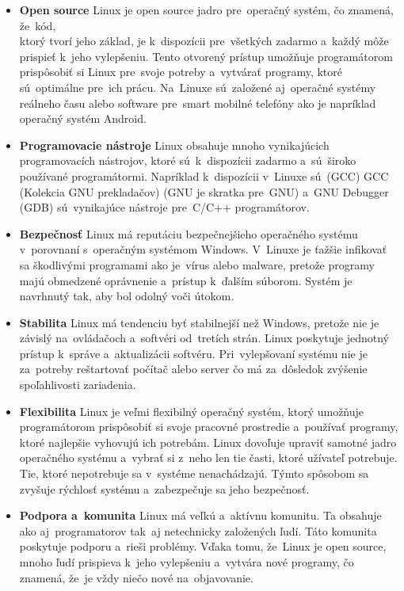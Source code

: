 \begin{itemize}
	\item \textbf{Open source} Linux je open source jadro pre~operačný systém, čo znamená, že~kód,\\
		ktorý tvorí jeho základ, je k~dispozícii pre~všetkých zadarmo a~každý môže prispieť
		k~jeho vylepšeniu. Tento otvorený prístup umožňuje programátorom prispôsobiť si Linux
		pre~svoje potreby a~vytvárať programy, ktoré sú~optimálne pre~ich prácu. Na~Linuxe
		sú~založené aj~operačné systémy reálneho času alebo software pre~smart mobilné telefóny
		ako je napríklad operačný systém Android.

	\item \textbf{Programovacie nástroje} Linux obsahuje mnoho vynikajúcich programovacích nástrojov, ktoré sú~k~dispozícii
		zadarmo a~sú~široko používané programátormi. Napríklad k~dispozícii v~Linuxe sú~(GCC) \acrlong{GCC} (Kolekcia GNU prekladačov)
		(GNU je skratka pre~\acrlong{GNU}) a~GNU Debugger (GDB) sú~vynikajúce nástroje pre~C/C++ programátorov.

	\item \textbf{Bezpečnosť} Linux má reputáciu bezpečnejšieho operačného systému v~porovnaní s~operačným systémom Windows.
		V~Linuxe je ťažšie infikovať sa škodlivými programami ako je~vírus alebo malware, pretože programy majú obmedzené
		oprávnenie a~prístup k~ďalším súborom. Systém je navrhnutý tak, aby bol odolný voči útokom.

	\item \textbf{Stabilita} Linux má tendenciu byť stabilnejší než Windows, pretože nie je závislý na~ovládačoch a~softvéri
		od~tretích strán. Linux poskytuje jednotný prístup k~správe a~aktualizácii softvéru. Pri~vylepšovaní systému nie je
		za~potreby reštartovať počítač alebo server čo má za~dôsledok zvýšenie spoľahlivosti zariadenia.

	\item \textbf{Flexibilita} Linux je veľmi flexibilný operačný systém, ktorý umožňuje programátorom prispôsobiť si svoje pracovné
		prostredie a~používať programy, ktoré najlepšie vyhovujú ich potrebám. Linux dovoľuje upraviť samotné jadro
		operačného systému a~vybrať si z~neho len tie časti, ktoré užívateľ potrebuje. Tie, ktoré nepotrebuje sa
		v~systéme nenachádzajú. Týmto spôsobom sa zvyšuje rýchlosť systému a~zabezpečuje sa jeho bezpečnosť.

	\item \textbf{Podpora a~komunita} Linux má veľkú a~aktívnu komunitu. Ta obsahuje ako aj~programatorov tak~aj
		netechnicky založených ľudí. Táto komunita poskytuje podporu a~rieši problémy. Vďaka tomu, že~Linux je
		open source, mnoho ľudí prispieva k~jeho vylepšeniu a~vytvára nové programy, čo znamená, že~je vždy
		niečo nové na~objavovanie.


\end{itemize}
